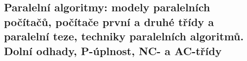 \subsection{Paralelní algoritmy: modely paralelních počítačů, počítače první a druhé třídy a paralelní teze, techniky paralelních algoritmů. Dolní odhady, P-úplnost, NC- a AC-třídy}
